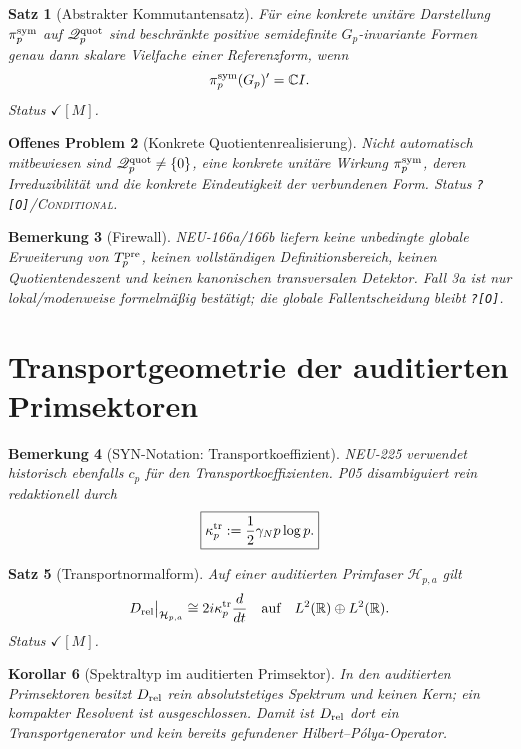\documentclass[11pt,a4paper]{amsart}
\newtheorem{theorem}{Satz}[section]
\newtheorem{corollary}[theorem]{Korollar}
\newtheorem{remark}[theorem]{Bemerkung}
\newtheorem{openproblem}[theorem]{Offenes Problem}
\newcommand{\stM}{\ensuremath{\checkmark[M]}}
\newcommand{\Open}{\texttt{?[O]}}
\newcommand{\Conditional}{\textsc{Conditional}}
\begin{document}
\begin{theorem}[Abstrakter Kommutantensatz]
Für eine konkrete unitäre Darstellung $\pi_p^{\rm sym}$ auf
$\mathscr Q_p^{\rm quot}$ sind beschränkte positive semidefinite
$G_p$-invariante Formen genau dann skalare Vielfache einer Referenzform, wenn
\[
\pi_p^{\rm sym}(G_p)'=\mathbb C I.
\]
Status \stM.
\end{theorem}

\begin{openproblem}[Konkrete Quotientenrealisierung]
Nicht automatisch mitbewiesen sind
$\mathscr Q_p^{\rm quot}\neq\{0\}$, eine konkrete unitäre Wirkung
$\pi_p^{\rm sym}$, deren Irreduzibilität und die konkrete Eindeutigkeit der
verbundenen Form. Status \Open/\Conditional.
\end{openproblem}

\begin{remark}[Firewall]
NEU-166a/166b liefern keine unbedingte globale Erweiterung von $T_p^{\rm pre}$,
keinen vollständigen Definitionsbereich, keinen Quotientendeszent und keinen
kanonischen transversalen Detektor. Fall 3a ist nur lokal/modenweise
formelmäßig bestätigt; die globale Fallentscheidung bleibt \Open.
\end{remark}

\section{Transportgeometrie der auditierten Primsektoren}

\begin{remark}[SYN-Notation: Transportkoeffizient]
NEU-225 verwendet historisch ebenfalls $c_p$ für den Transportkoeffizienten.
P05 disambiguiert rein redaktionell durch
\[
\boxed{\kappa_p^{\rm tr}:=\frac12\gamma_Np\log p.}
\]
\end{remark}

\begin{theorem}[Transportnormalform]\label{thm:transport}
Auf einer auditierten Primfaser $\mathcal H_{p,a}$ gilt
\[
D_{\rm rel}\big|_{\mathcal H_{p,a}}
\cong2i\kappa_p^{\rm tr}\frac{d}{dt}
\quad\text{auf}\quad
L^2(\mathbb R)\oplus L^2(\mathbb R).
\]
Status \stM.
\end{theorem}

\begin{corollary}[Spektraltyp im auditierten Primsektor]
In den auditierten Primsektoren besitzt $D_{\rm rel}$ rein absolutstetiges
Spektrum und keinen Kern; ein kompakter Resolvent ist ausgeschlossen. Damit
ist $D_{\rm rel}$ dort ein Transportgenerator und kein bereits gefundener
Hilbert--Pólya-Operator.
\end{corollary}
\end{document}
